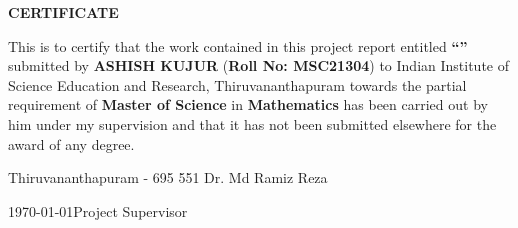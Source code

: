 \begin{center}
{\large{\bf{CERTIFICATE}}}
\end{center}
\thispagestyle{empty}


\noindent
This is to certify that the work contained in this project report entitled \textbf{``\ttle''}  submitted by \textbf{ASHISH KUJUR} (\textbf{Roll No: MSC21304}) to Indian Institute of Science Education and Research, Thiruvananthapuram towards the partial requirement of {\bf Master of Science} in \textbf{Mathematics} has been carried out by him under my supervision and that it has not been submitted elsewhere for the award of any degree.



\vspace{4cm}

\noindent Thiruvananthapuram - 695 551 \hfill Dr. Md Ramiz Reza

\noindent \today \hfill Project Supervisor

\clearpage

